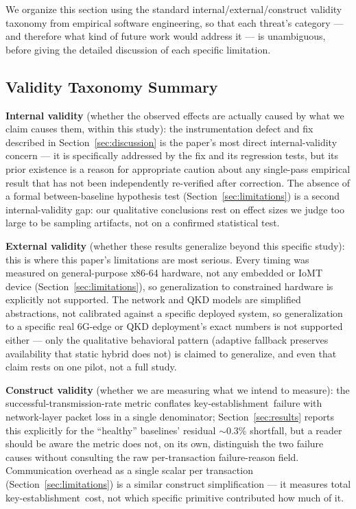 \documentclass[journal]{IEEEtran}
\newcommand{\keyest}{key-establishment}
\begin{document}
We organize this section using the standard internal/external/construct validity taxonomy from empirical software engineering, so that each threat's category --- and therefore what kind of future work would address it --- is unambiguous, before giving the detailed discussion of each specific limitation.

\subsection{Validity Taxonomy Summary}

\textbf{Internal validity} (whether the observed effects are actually caused by what we claim causes them, within this study): the instrumentation defect and fix described in Section~\ref{sec:discussion} is the paper's most direct internal-validity concern --- it is specifically addressed by the fix and its regression tests, but its prior existence is a reason for appropriate caution about any single-pass empirical result that has not been independently re-verified after correction. The absence of a formal between-baseline hypothesis test (Section~\ref{sec:limitations}) is a second internal-validity gap: our qualitative conclusions rest on effect sizes we judge too large to be sampling artifacts, not on a confirmed statistical test.

\textbf{External validity} (whether these results generalize beyond this specific study): this is where this paper's limitations are most serious. Every timing was measured on general-purpose x86-64 hardware, not any embedded or IoMT device (Section~\ref{sec:limitations}), so generalization to constrained hardware is explicitly not supported. The network and QKD models are simplified abstractions, not calibrated against a specific deployed system, so generalization to a specific real 6G-edge or QKD deployment's exact numbers is not supported either --- only the qualitative behavioral pattern (adaptive fallback preserves availability that static hybrid does not) is claimed to generalize, and even that claim rests on one pilot, not a full study.

\textbf{Construct validity} (whether we are measuring what we intend to measure): the successful-transmission-rate metric conflates \keyest\ failure with network-layer packet loss in a single denominator; Section~\ref{sec:results} reports this explicitly for the ``healthy'' baselines' residual $\sim$0.3\% shortfall, but a reader should be aware the metric does not, on its own, distinguish the two failure causes without consulting the raw per-transaction failure-reason field. Communication overhead as a single scalar per transaction (Section~\ref{sec:limitations}) is a similar construct simplification --- it measures total \keyest\ cost, not which specific primitive contributed how much of it.
\end{document}

